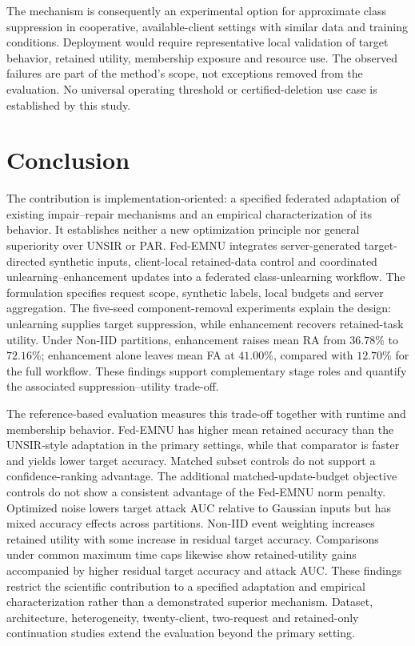 \documentclass[software,article,submit,moreauthors]{Definitions/mdpi}
\begin{document}
The mechanism is consequently an experimental option for approximate
class suppression in cooperative, available-client settings with similar
data and training conditions. Deployment would require representative local
validation of target behavior, retained utility, membership exposure and
resource use. The observed failures are part of the method's scope, not
exceptions removed from the evaluation. No universal operating threshold or
certified-deletion use case is established by this study.


\section{Conclusion}
\label{sec:conclusion}
The contribution is implementation-oriented: a specified federated adaptation
of existing impair--repair mechanisms and an empirical characterization of its
behavior. It establishes neither a new optimization principle nor general
superiority over UNSIR or PAR. Fed-EMNU integrates server-generated target-directed synthetic inputs,
client-local retained-data control and coordinated unlearning--enhancement
updates into a federated class-unlearning workflow. The formulation specifies
request scope, synthetic labels, local budgets and server aggregation.
The five-seed component-removal experiments explain the design: unlearning
supplies target suppression, while enhancement recovers retained-task utility.
Under Non-IID partitions, enhancement raises mean RA from $36.78$\% to
$72.16$\%; enhancement alone leaves mean FA at $41.00$\%, compared with
$12.70$\% for the full workflow. These findings support complementary stage
roles and quantify the associated suppression--utility trade-off.

The reference-based evaluation measures this trade-off together with runtime
and membership behavior. Fed-EMNU has higher mean retained accuracy than the
UNSIR-style adaptation in the primary settings, while that comparator is faster
and yields lower target accuracy. Matched subset controls do not support a
confidence-ranking advantage. The additional matched-update-budget objective controls
do not show a consistent advantage of the Fed-EMNU norm penalty. Optimized
noise lowers target attack AUC relative to Gaussian inputs but has mixed
accuracy effects across partitions. Non-IID event weighting
increases retained utility with some increase in residual target accuracy.
Comparisons under common maximum time caps likewise show retained-utility gains accompanied
by higher residual target accuracy and attack AUC. These findings restrict the scientific contribution to a specified adaptation
and empirical characterization rather than a demonstrated superior mechanism.
Dataset, architecture, heterogeneity,
twenty-client, two-request and retained-only continuation studies extend the
evaluation beyond the primary setting.
\end{document}
